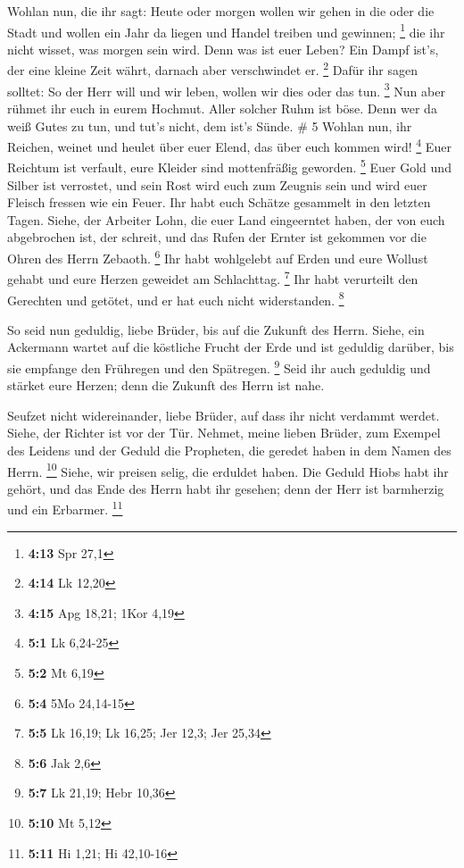 Wohlan nun, die ihr sagt: Heute oder morgen wollen wir
gehen in die oder die Stadt und wollen ein Jahr da liegen und Handel
treiben und gewinnen; \footnote{\textbf{4:13} Spr 27,1} 
die ihr nicht wisset, was morgen sein wird. Denn was ist euer Leben? Ein
Dampf ist's, der eine kleine Zeit währt, darnach aber verschwindet er.
\footnote{\textbf{4:14} Lk 12,20}  Dafür ihr sagen solltet:
So der Herr will und wir leben, wollen wir dies oder das tun.
\footnote{\textbf{4:15} Apg 18,21; 1Kor 4,19}  Nun aber
rühmet ihr euch in eurem Hochmut. Aller solcher Ruhm ist böse.
 Denn wer da weiß Gutes zu tun, und tut's nicht, dem ist's
Sünde. \# 5  Wohlan nun, ihr Reichen, weinet und heulet über
euer Elend, das über euch kommen wird! \footnote{\textbf{5:1} Lk 6,24-25}
 Euer Reichtum ist verfault, eure Kleider sind mottenfräßig
geworden. \footnote{\textbf{5:2} Mt 6,19}  Euer Gold und
Silber ist verrostet, und sein Rost wird euch zum Zeugnis sein und wird
euer Fleisch fressen wie ein Feuer. Ihr habt euch Schätze gesammelt in
den letzten Tagen.  Siehe, der Arbeiter Lohn, die euer Land
eingeerntet haben, der von euch abgebrochen ist, der schreit, und das
Rufen der Ernter ist gekommen vor die Ohren des Herrn Zebaoth.
\footnote{\textbf{5:4} 5Mo 24,14-15}  Ihr habt wohlgelebt
auf Erden und eure Wollust gehabt und eure Herzen geweidet am
Schlachttag. \footnote{\textbf{5:5} Lk 16,19; Lk 16,25; Jer 12,3; Jer
  25,34}  Ihr habt verurteilt den Gerechten und getötet, und
er hat euch nicht widerstanden. \footnote{\textbf{5:6} Jak 2,6}

 So seid nun geduldig, liebe Brüder, bis auf die Zukunft des
Herrn. Siehe, ein Ackermann wartet auf die köstliche Frucht der Erde und
ist geduldig darüber, bis sie empfange den Frühregen und den Spätregen.
\footnote{\textbf{5:7} Lk 21,19; Hebr 10,36}  Seid ihr auch
geduldig und stärket eure Herzen; denn die Zukunft des Herrn ist nahe.

 Seufzet nicht widereinander, liebe Brüder, auf dass ihr
nicht verdammt werdet. Siehe, der Richter ist vor der Tür. 
Nehmet, meine lieben Brüder, zum Exempel des Leidens und der Geduld die
Propheten, die geredet haben in dem Namen des Herrn. \footnote{\textbf{5:10}
  Mt 5,12}  Siehe, wir preisen selig, die erduldet haben.
Die Geduld Hiobs habt ihr gehört, und das Ende des Herrn habt ihr
gesehen; denn der Herr ist barmherzig und ein Erbarmer. \footnote{\textbf{5:11}
  Hi 1,21; Hi 42,10-16}

